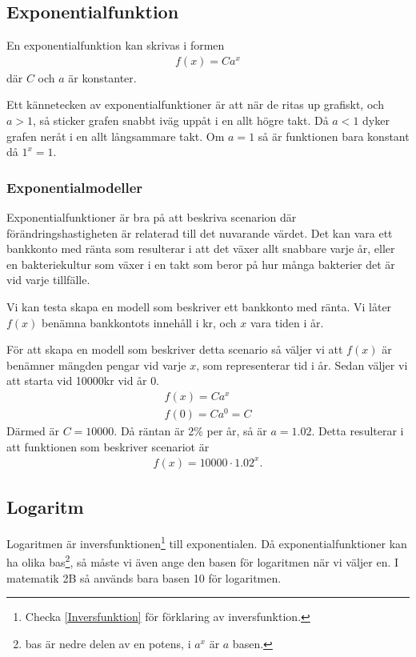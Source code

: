 \newpage
\subsection{Exponentialfunktion}

\begin{definition}
	En exponentialfunktion kan skrivas i formen
	\begin{align}
		f(x)=Ca^x
	\end{align}
	där $C$ och $a$ är konstanter.
 \end{definition}
 

Ett kännetecken av exponentialfunktioner är att när de ritas up grafiskt, och $a > 1$, så sticker grafen snabbt iväg uppåt i en allt högre takt. Då $a < 1$ dyker grafen neråt i en allt långsammare takt. Om $a=1$ så är funktionen bara konstant då $1^x=1$.

\subsubsection{Exponentialmodeller}

Exponentialfunktioner är bra på att beskriva scenarion där förändringshastigheten är relaterad till det nuvarande värdet. Det kan vara ett bankkonto med ränta som resulterar i att det växer allt snabbare varje år, eller en bakteriekultur som växer i en takt som beror på hur många bakterier det är vid varje tillfälle.

Vi kan testa skapa en modell som beskriver ett bankkonto med ränta. Vi låter $f(x)$ benämna bankkontots innehåll i kr, och $x$ vara tiden i år.

För att skapa en modell som beskriver detta scenario så väljer vi att $f(x)$ är benämner mängden pengar vid varje $x$, som representerar tid i år. Sedan väljer vi att starta vid 10000kr vid år 0.
\begin{align}
	f(x)=Ca^x \\
	f(0)=Ca^0 = C
\end{align}
Därmed är $C = 10000$. Då räntan är 2\% per år, så är $a=1.02$. Detta resulterar i att funktionen som beskriver scenariot är
\begin{align}
	f(x)=10000\cdot1.02^x.
\end{align}

\newpage
\subsection{Logaritm}

Logaritmen är inversfunktionen\footnote{Checka \ref{Inversfunktion} för förklaring av inversfunktion.} till exponentialen. Då exponentialfunktioner kan ha olika bas\footnote{bas är nedre delen av en potens, i $a^x$ är $a$ basen.}, så måste vi även ange den basen för logaritmen när vi väljer en. I matematik 2B så används bara basen 10 för logaritmen.

